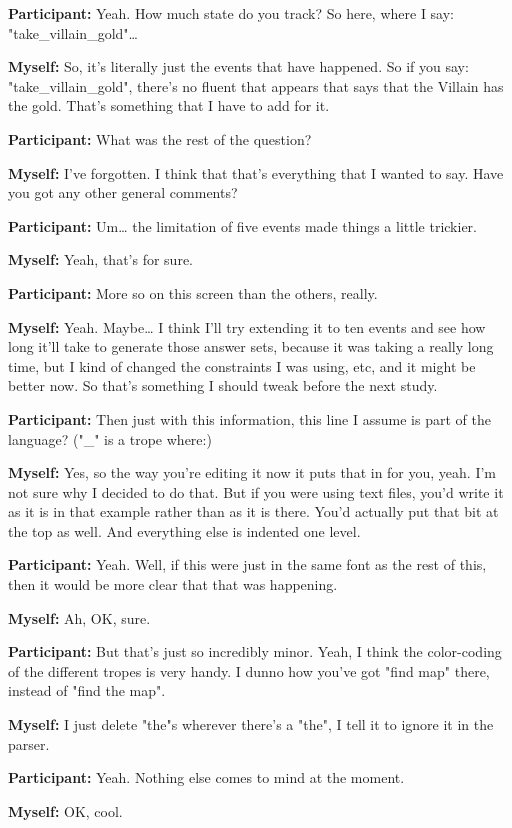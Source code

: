 \documentclass[11pt]{report}
\newcommand{\llabel}[1]{\hypertarget{llineno:#1}{\linelabel{#1}}}
\begin{document}
\begin{linenumbers}
\textbf{Participant:} Yeah. How much state do you track? So here, where I say: "take_villain_gold"\ldots{}

\textbf{Myself:} So, it's literally just the events that have happened. So if you say: "take_villain_gold", there's no fluent that appears that says that the Villain has the gold. That's something that I have to add for it.

\textbf{Participant:} What was the rest of the question?

\textbf{Myself:} I've forgotten. I think that that's everything that I wanted to say. Have you got any other general comments?

\textbf{Participant:} Um\ldots{} the limitation of five events made things a
little trickier.\llabel{lne:bug1h2}

\textbf{Myself:} Yeah, that's for sure.

\textbf{Participant:} More so on this screen than the others, really.

\textbf{Myself:} Yeah. Maybe\ldots{} I think I'll try extending it to ten events and see how long it'll take to generate those answer sets, because it was taking a really long time, but I kind of changed the constraints I was using, etc, and it might be better now. So that's something I should tweak before the next study.

\textbf{Participant:} Then just with this information, this line I assume is part of the language? ("\_" is a trope where:)

\textbf{Myself:} Yes, so the way you're editing it now it puts that in for you, yeah. I'm not sure why I decided to do that. But if you were using text files, you'd write it as it is in that example rather than as it is there. You'd actually put that bit at the top as well. And everything else is indented one level.

\textbf{Participant:} Yeah. Well, if this were just in the same font as the rest of this, then it would be more clear that that was happening.

\textbf{Myself:} Ah, OK, sure.

\textbf{Participant:} But that's just so incredibly minor. Yeah, I think the
color-coding of the different tropes is very handy. I dunno how you've got "find
map" there, instead of "find the map".\llabel{lne:syntax3h}

\textbf{Myself:} I just delete "the"s wherever there's a "the", I tell it to ignore it in the parser.

\textbf{Participant:} Yeah. Nothing else comes to mind at the moment.

\textbf{Myself:} OK, cool.

\end{linenumbers}
\resetlinenumber[1]




\end{document}
